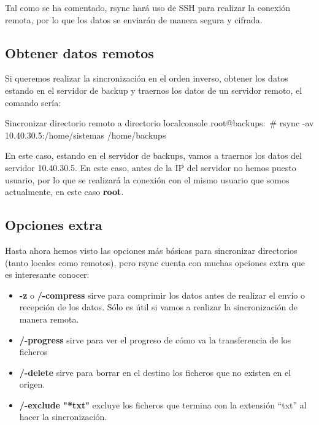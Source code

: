 Tal como se ha comentado, rsync hará uso de SSH para realizar la conexión remota, por lo que los datos se enviarán de manera segura y cifrada.

\subsection{Obtener datos remotos}
Si queremos realizar la sincronización en el orden inverso, obtener los datos estando en el servidor de backup y traernos los datos de un servidor remoto, el comando sería:

\begin{mycode}{Sincronizar directorio remoto a directorio local}{console}{}
root@backups:~# rsync -av 10.40.30.5:/home/sistemas  /home/backups
\end{mycode}

En este caso, estando en el servidor de backups, vamos a traernos los datos del servidor 10.40.30.5. En este caso, antes de la IP del servidor no hemos puesto usuario, por lo que se realizará la conexión con el mismo usuario que somos actualmente, en este caso \textbf{root}.

\subsection{Opciones extra}
Hasta ahora hemos visto las opciones más básicas para sincronizar directorios (tanto locales como remotos), pero rsync cuenta con muchas opciones extra que es interesante conocer:

\begin{itemize}
    \item \textbf{-z} o {\textbf{\-/-compress}} sirve para comprimir los datos antes de realizar el envío o recepción de los datos. Sólo es útil si vamos a realizar la sincronización de manera remota.
    \item \textbf{\-/-progress} sirve para ver el progreso de cómo va la transferencia de los ficheros
    \item \textbf{\-/-delete} sirve para borrar en el destino los ficheros que no existen en el origen.
    \item \textbf{\-/-exclude "*txt"} excluye los ficheros que termina con la extensión “txt” al hacer la sincronización.
\end{itemize}



